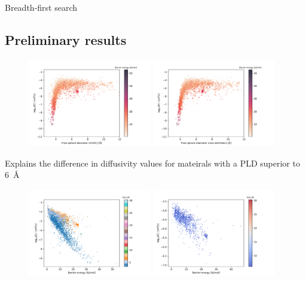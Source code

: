 \documentclass[main]{subfiles}
\begin{document}
Breadth-first search

\subsection{Preliminary results}


\begin{figure}[ht]
  \centering
    \includegraphics[width=0.48\textwidth]{figures/5-diffusion/difflog_Df-ccdc_barrier.pdf}
    \includegraphics[width=0.48\textwidth]{figures/5-diffusion/difflog_Df-uff298K_barrier.pdf}
    \caption{}\label{fgr:diff_pld_barrier}
\end{figure}

Explains the difference in diffusivity values for mateirals with a PLD superior to \SI{6}{\angstrom}
\begin{figure}[ht]
  \centering
    \includegraphics[width=0.48\textwidth]{figures/5-diffusion/difflog_barrier_Df_uff.pdf}
    \includegraphics[width=0.48\textwidth]{figures/5-diffusion/difflog_barrier_Df_uff_2.pdf}
    \caption{}\label{fgr:barrier_diffusion}
\end{figure}
\end{document}
